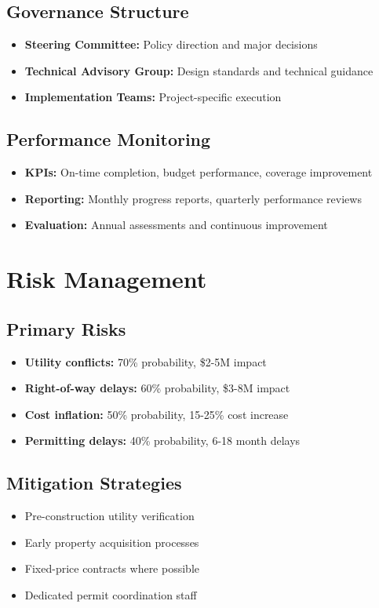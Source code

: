 \documentclass[11pt,letterpaper]{report}
\begin{document}
\subsection{Governance Structure}
\begin{itemize}
    \item \textbf{Steering Committee:} Policy direction and major decisions
    \item \textbf{Technical Advisory Group:} Design standards and technical guidance
    \item \textbf{Implementation Teams:} Project-specific execution
\end{itemize}

\subsection{Performance Monitoring}
\begin{itemize}
    \item \textbf{KPIs:} On-time completion, budget performance, coverage improvement
    \item \textbf{Reporting:} Monthly progress reports, quarterly performance reviews
    \item \textbf{Evaluation:} Annual assessments and continuous improvement
\end{itemize}

\section{Risk Management}

\subsection{Primary Risks}
\begin{itemize}
    \item \textbf{Utility conflicts:} 70\% probability, \$2-5M impact
    \item \textbf{Right-of-way delays:} 60\% probability, \$3-8M impact
    \item \textbf{Cost inflation:} 50\% probability, 15-25\% cost increase
    \item \textbf{Permitting delays:} 40\% probability, 6-18 month delays
\end{itemize}

\subsection{Mitigation Strategies}
\begin{itemize}
    \item Pre-construction utility verification
    \item Early property acquisition processes
    \item Fixed-price contracts where possible
    \item Dedicated permit coordination staff
\end{itemize}
\end{document}
